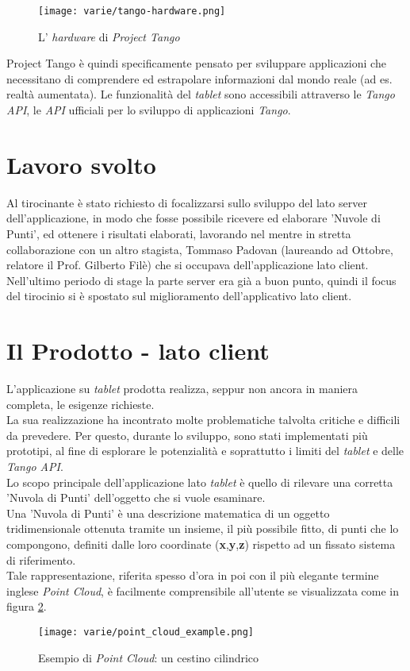 \begin{figure}[!h] 
    \centering 
    \texttt{[image: varie/tango-hardware.png]} 
    \caption{L' \emph{hardware} di \emph{Project Tango}}
    \label{fig:tango_hardware}
\end{figure}

\noindent
Project Tango è quindi specificamente pensato per sviluppare applicazioni che necessitano di comprendere ed estrapolare informazioni dal mondo reale (ad es. realtà aumentata).
Le funzionalità del \emph{tablet} sono accessibili attraverso le \emph{Tango API}, le \emph{API} ufficiali per lo sviluppo di applicazioni \emph{Tango}.

\section{Lavoro svolto}
Al tirocinante è stato richiesto di focalizzarsi sullo sviluppo del lato server dell'applicazione, in modo che fosse possibile ricevere ed elaborare 'Nuvole di Punti', ed ottenere i risultati elaborati, lavorando nel mentre in stretta collaborazione con un altro stagista, Tommaso Padovan (laureando ad Ottobre, relatore il Prof. Gilberto Filè) che si occupava dell'applicazione lato client. Nell'ultimo periodo di stage la parte server era già a buon punto, quindi il focus del tirocinio si è spostato sul miglioramento dell'applicativo lato client.

\section{Il Prodotto - lato client}

L'applicazione su \emph{tablet} prodotta realizza, seppur non ancora in maniera completa, le esigenze richieste. \\
La sua realizzazione ha incontrato molte problematiche talvolta critiche e difficili da prevedere. Per questo, durante lo sviluppo, sono stati implementati più prototipi, al fine di esplorare le potenzialità e soprattutto i limiti del \emph{tablet} e delle \emph{Tango API}. \\
Lo scopo principale dell'applicazione lato \emph{tablet} è quello di rilevare una corretta 'Nuvola di Punti' dell'oggetto che si vuole esaminare.\\
Una 'Nuvola di Punti' è una descrizione matematica di un oggetto tridimensionale ottenuta tramite un insieme, il più possibile fitto, di punti che lo compongono, definiti dalle loro coordinate (\textbf{x},\textbf{y},\textbf{z}) rispetto ad un fissato sistema di riferimento. \\
Tale rappresentazione, riferita spesso d'ora in poi con il più elegante termine inglese \emph{Point Cloud}, è facilmente comprensibile all'utente se visualizzata come in figura \ref{fig:point_cloud_example}.
\begin{figure}[!h] 
    \centering 
    \texttt{[image: varie/point\_cloud\_example.png]} 
    \caption{Esempio di \emph{Point Cloud}: un cestino cilindrico}
   \label{fig:point_cloud_example}
\end{figure}

